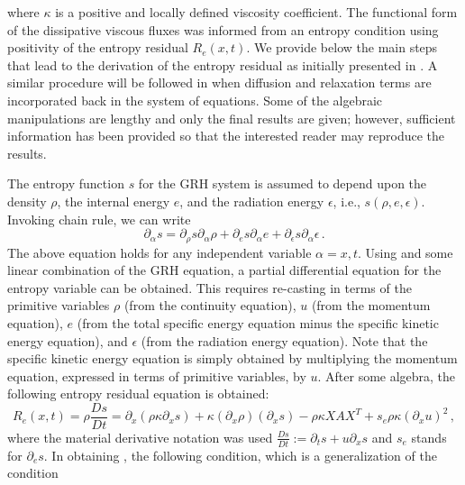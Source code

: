 \documentclass[times]{fldauth}
\begin{document}
%
where $\kappa$ is a positive and locally defined viscosity coefficient.
The functional form of the dissipative viscous fluxes was informed from an entropy condition using positivity of the 
entropy residual $R_e(x,t)$. We provide below the main steps that lead to the derivation of the entropy residual as 
initially presented in \cite{our_jcp_radhy_paper}. A similar procedure will be followed in  when 
diffusion and relaxation terms are incorporated back in the system of equations. Some of the algebraic manipulations 
are lengthy and only the final results are given; however, sufficient information has been provided so that 
the interested reader may reproduce the results. 

The entropy function $s$ for the GRH system is assumed to depend upon the density $\rho$, the internal energy $e$, and the radiation energy $\epsilon$, i.e., $s( \rho, e, \epsilon)$. Invoking chain rule, we can write
%
\begin{equation}
\label{eq:chain_rule_entropy}
\partial_{\alpha} s = \partial_{\rho} s \partial_{\alpha} \rho +  \partial_{e} s \partial_{\alpha}e +  \partial_{\epsilon} s \partial_{\alpha} \epsilon \,.
\end{equation}
The above equation holds for any independent variable $\alpha=x,t$. Using  and some linear
combination of the GRH equation, a partial differential equation for the entropy variable can be obtained. This requires
re-casting   in terms of the primitive variables $\rho$ (from  the continuity 
equation), $u$  (from  the momentum equation), $e$ (from the total specific energy equation minus the specific 
kinetic energy equation), and $\epsilon$ (from the radiation energy equation). Note that 
the specific kinetic energy equation is simply obtained by multiplying the momentum equation, expressed in terms of primitive variables, by $u$. After some algebra, the following entropy residual equation is obtained:
%
\begin{equation} 
\label{eq:app_entr_eq_non_equil}
R_e(x,t) = \rho \frac{Ds}{Dt} = \partial_x \left( \rho \kappa \partial_x s \right) + \kappa \left(\partial_x \rho\right) \left( \partial_x s\right) - \rho \kappa X A X^T  + s_e \rho \kappa (\partial_x u)^2 \, ,
\end{equation} 
% 
where the material derivative notation was used $\frac{Ds}{Dt} := \partial_t s + u \partial_x s$ and
$s_e$ stands for $\partial_e s$. 
In obtaining , the following condition, which is a generalization of the condition
\end{document}
